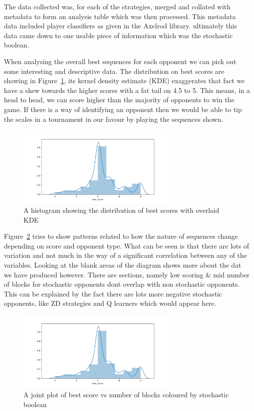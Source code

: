 The data collected was, for each of the strategies, merged and collated with metadata to form an analysis table which was then processed.
This metadata data included player classifiers as given in the Axelrod library.
ultimately this data came down to one usable piece of information which was the stochastic boolean. 

When analysing the overall best sequences for each opponent we can pick out some interesting and descriptive data.
The distribution on best scores are showing in Figure~\ref{fig:best_score_hist}, its kernel density estimate (KDE) exaggerates that fact we have a skew towards the higher scores with a fat tail on 4.5 to 5.
This means, in a head to head, we can score higher than the majority of opponents to win the game.
If there is a way of identifying an opponent then we would be able to tip the scales in a tournament in our favour by playing the sequences shown.

\begin{figure}[ht]
    \includegraphics[width=0.7\textwidth, center]{./img/descriptive/best_score_hist.pdf}
    \caption{A histogram showing the distribution of best scores with overlaid KDE}\label{fig:best_score_hist}
\end{figure}

Figure~\ref{fig:cor_plot} tries to show patterns related to how the nature of sequences change depending on score and opponent type.
What can be seen is that there are lots of variation and not much in the way of a significant correlation between any of the variables.
Looking at the blank areas of the diagram shows more about the dat we have produced however.
There are sections, namely low scoring \& mid number of blocks for stochastic opponents dont overlap with non stochastic  opponents.
This can be explained by the fact there are lots more negative stochastic opponents, like ZD strategies and Q learners which would appear here. 

\begin{figure}[ht]
    \includegraphics[width=0.7\textwidth, center]{./img/descriptive/cor_plot.pdf}
    \caption{A joint plot of best score vs number of blocks coloured by stochastic boolean}\label{fig:cor_plot}
\end{figure}

